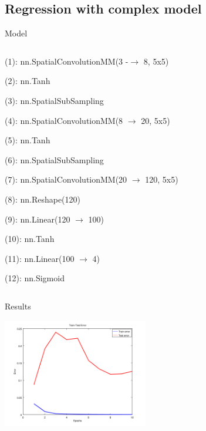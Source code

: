 \documentclass{beamer}
\begin{document}
\subsection{Regression with complex model}
\begin{frame}{Model}
	\begin{columns}[T]
		\begin{column}{0.70\textwidth}
			\footnotesize
				\color[rgb]{0,0,0.545098}
			  (1): \hspace{0.16cm}nn.SpatialConvolutionMM(3 -$\rightarrow$ 8, 5x5)
			  
			  (2):\hspace{0.16cm} nn.Tanh
			  
			  (3): \hspace{0.16cm}nn.SpatialSubSampling
			  
				\color[rgb]{0.333333,0.419608,0.184314}			  
			  (4): \hspace{0.16cm}nn.SpatialConvolutionMM(8 $\rightarrow$ 20, 5x5)
			  
			  (5): \hspace{0.16cm}nn.Tanh
			  
			  (6): \hspace{0.16cm}nn.SpatialSubSampling
			  
			  \color[rgb]{0.180392,0.545098,0.341176}
			  (7): \hspace{0.16cm}nn.SpatialConvolutionMM(20 $\rightarrow$ 120, 5x5)
			  
			  (8): \hspace{0.16cm}nn.Reshape(120)
			  
			  (9): \hspace{0.16cm}nn.Linear(120 $\rightarrow$ 100)
			  
			  (10): nn.Tanh
			  
			  (11): nn.Linear(100 $\rightarrow$ 4)
			  
			  (12): nn.Sigmoid
			  
		\end{column}
		\begin{column}{0.30\textwidth}
		\end{column}
	\end{columns}
\end{frame}

\begin{frame}{Results}
	\begin{center}
		\includegraphics[width=240px,height=180px]{img/train-test-100}
    \end{center}
\end{frame}
\end{document}
